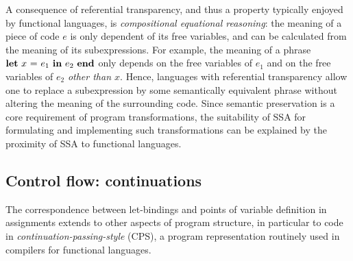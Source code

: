 {A consequence of referential transparency, and thus a property
typically enjoyed by functional languages, is \emph{compositional
equational reasoning}:
the meaning of a piece of code $e$ is only
dependent of its free variables, and can be calculated from the meaning
of its subexpressions. For example, the meaning of a phrase $\mathbf{let}\ {x}\ \mathbf{=}\ {e_1}\ \mathbf{in}\ {e_2}\ \mathbf{end}$ only depends on the free variables of $e_1$ and on the
free variables of $e_2$ \emph{other than $x$}. Hence, languages with
referential transparency allow one to replace a subexpression by some
semantically equivalent phrase without altering the meaning of the
surrounding code. Since semantic preservation is a core requirement of
program transformations, the suitability of SSA for formulating and
implementing such transformations can be explained by the proximity of
SSA to functional languages.

\subsection{Control flow: continuations}
\label{section:Part1:Semantics:Continuations}
The correspondence between let-bindings and points of variable
definition in assignments extends to other aspects of program
structure, in particular to code in
\emph{continuation-passing-style} 
(CPS), a program
representation routinely used in compilers for functional languages.


}
